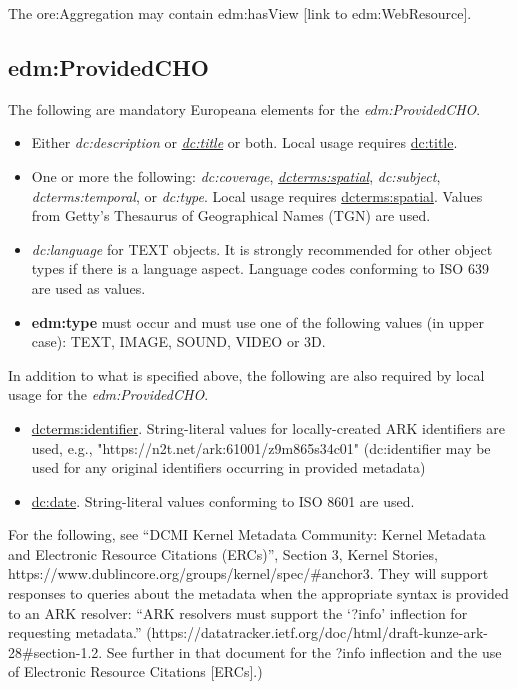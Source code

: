 \documentclass[11pt]{article}
\begin{document}
The ore:Aggregation may contain edm:hasView [link to edm:WebResource].

\subsection{edm:ProvidedCHO}
The following are mandatory Europeana elements for the \textit{edm:ProvidedCHO}.

\begin{itemize}

  \item Either \textit{dc:description} or \underline{\textit{dc:title}} or both. Local usage requires \underline{dc:title}.

  \item One or more the following: \textit{dc:coverage}, \underline{\textit{dcterms:spatial}}, \textit{dc:subject}, \textit{dcterms:temporal}, or \textit{dc:type}. Local usage requires \underline{dcterms:spatial}. Values from Getty's Thesaurus of Geographical Names (TGN) are used.

  \item \textit{dc:language} for TEXT objects. It is strongly recommended for other object types if there is a language aspect. Language codes conforming to ISO 639 are used as values.

  \item \textbf{edm:type} must occur and must use one of the following values (in upper case): TEXT, IMAGE, SOUND, VIDEO or 3D.
\end{itemize}

In addition to what is specified above, the following are also required by local usage for the \textit{edm:ProvidedCHO}.
\begin{itemize}
  \item \underline{dcterms:identifier}. String-literal values for locally-created ARK identifiers are used, e.g., "https://n2t.net/ark:61001/z9m865s34c01" (dc:identifier may be used for any original identifiers occurring in provided metadata)

  \item \underline{dc:date}. String-literal values conforming to ISO 8601 are used.

\end{itemize}

For the following, see ``DCMI Kernel Metadata Community: Kernel Metadata and Electronic Resource Citations (ERCs)'', Section 3, Kernel Stories, https://www.dublincore.org/groups/kernel/spec/\#anchor3. They will support responses to queries about the metadata when the appropriate syntax is provided to an ARK resolver: ``ARK resolvers must support the `?info' inflection for requesting metadata.'' (https://datatracker.ietf.org/doc/html/draft-kunze-ark-28\#section-1.2. See further in that document for the ?info inflection and the use of Electronic Resource Citations [ERCs].)
\end{document}
